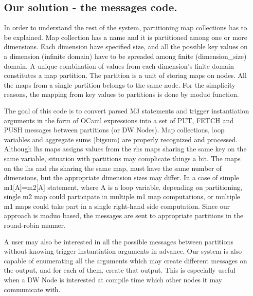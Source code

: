 \documentclass{sig-semester}
\begin{document}
\subsection{Our solution - the messages code.}
In order to understand the rest of the system, partitioning map collections has to be explained. Map collection has a name and it is partitioned among one or more dimensions. Each dimension have specified size, and all the possible key values on a dimension (infinite domain) have to be spreaded among finite (dimension\_size) domain. A unique combination of values from each dimension's finite domain constitutes a map partition. The partition is a unit of storing maps on nodes. All the maps from a single partition belongs to the same node. For the simplicity reasons, the mapping from key values to partitions is done by moduo function.

The goal of this code is to convert parsed M3 statements and trigger instantiation arguments in the form of OCaml expressions into a set of PUT, FETCH and PUSH messages between partitions (or DW Nodes). Map collections, loop variables and aggregate sums (bigsum) are properly recognized and processed. Although lhs maps assigns values from the rhs maps sharing the same key on the same variable, situation with partitions may complicate things a bit. The maps on the lhs and rhs sharing the same map, must have the same number of dimensions, but the appropriate dimension sizes may differ. In a case of simple m1[A]=m2[A] statement, where A is a loop variable, depending on partitioning, single m2 map could participate in multiple m1 map computations, or multiple m1 maps could take part in a single right-hand side computation. Since our approach is moduo based, the messages are sent to appropriate partitions in the round-robin manner.

A user may also be interested in all the possible messages between partitions without knowing trigger instantiation arguments in advance. Our system is also capable of enumerating all the arguments which may create different messages on the output, and for each of them, create that output. This is especially useful when a DW Node is interested at compile time which other nodes it may communicate with.
\end{document}
